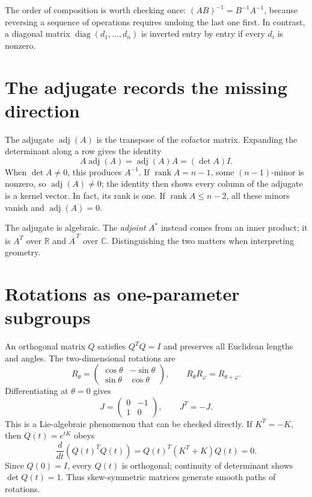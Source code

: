 The order of composition is worth checking once:
$(AB)^{-1}=B^{-1}A^{-1}$, because reversing a sequence of operations requires undoing the last one first. In contrast, a diagonal matrix $\operatorname{diag}(d_1,\ldots,d_n)$ is inverted entry by entry if every $d_i$ is nonzero.

\section{The adjugate records the missing direction}

The adjugate \(\operatorname{adj}(A)\) is the transpose of the cofactor matrix. Expanding the determinant along a row gives the identity
\[
 A\operatorname{adj}(A)=\operatorname{adj}(A)A=(\det A)I.
\]
When \(\det A\ne0\), this produces \(A^{-1}\). If \(\operatorname{rank}A=n-1\), some \((n-1)\)-minor is nonzero, so \(\operatorname{adj}(A)\ne0\); the identity then shows every column of the adjugate is a kernel vector. In fact, its rank is one. If \(\operatorname{rank}A\le n-2\), all these minors vanish and \(\operatorname{adj}(A)=0\).

The adjugate is algebraic. The \emph{adjoint} \(A^*\) instead comes from an inner product; it is \(A^T\) over \(\mathbb R\) and \(\overline A^{\,T}\) over \(\mathbb C\). Distinguishing the two matters when interpreting geometry.

\section{Rotations as one-parameter subgroups}

An orthogonal matrix \(Q\) satisfies \(Q^TQ=I\) and preserves all Euclidean lengths and angles. The two-dimensional rotations are
\[
 R_\theta=
 \begin{pmatrix}\cos\theta&-\sin\theta\\
 \sin\theta&\cos\theta\end{pmatrix},
 \qquad R_\theta R_\varphi=R_{\theta+\varphi}.
\]
Differentiating at \(\theta=0\) gives
\[
 J=\begin{pmatrix}0&-1\\1&0\end{pmatrix},\qquad J^T=-J.
\]
This is a Lie-algebraic phenomenon that can be checked directly. If \(K^T=-K\), then \(Q(t)=e^{tK}\) obeys
\[
 \frac d{dt}(Q(t)^TQ(t))=Q(t)^T(K^T+K)Q(t)=0.
\]
Since \(Q(0)=I\), every \(Q(t)\) is orthogonal; continuity of determinant shows \(\det Q(t)=1\). Thus skew-symmetric matrices generate smooth paths of rotations.

